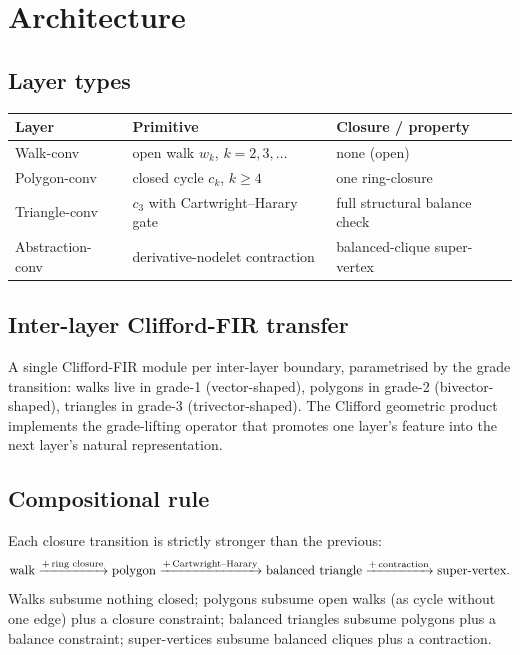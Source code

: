 \documentclass[11pt,a4paper]{article}
\begin{document}
\section{Architecture}

\subsection{Layer types}

\begin{center}
\begin{tabular}{lll}
\toprule
Layer            & Primitive                & Closure / property                          \\
\midrule
Walk-conv        & open walk $w_k$, $k = 2, 3, \ldots$ & none (open)                        \\
Polygon-conv     & closed cycle $c_k$, $k \geq 4$      & one ring-closure                   \\
Triangle-conv    & $c_3$ with Cartwright--Harary gate   & full structural balance check     \\
Abstraction-conv & derivative-nodelet contraction       & balanced-clique super-vertex      \\
\bottomrule
\end{tabular}
\end{center}

\subsection{Inter-layer Clifford-FIR transfer}

A single Clifford-FIR module per inter-layer boundary, parametrised
by the grade transition: walks live in grade-1 (vector-shaped),
polygons in grade-2 (bivector-shaped), triangles in grade-3
(trivector-shaped). The Clifford geometric product implements the
grade-lifting operator that promotes one layer's feature into the
next layer's natural representation.

\subsection{Compositional rule}

Each closure transition is strictly stronger than the previous:
\[
\text{walk} \xrightarrow{\text{+\,ring closure}}
\text{polygon} \xrightarrow{\text{+\,Cartwright--Harary}}
\text{balanced triangle} \xrightarrow{\text{+\,contraction}}
\text{super-vertex}.
\]
Walks subsume nothing closed; polygons subsume open walks
(as cycle without one edge) plus a closure constraint;
balanced triangles subsume polygons plus a balance constraint;
super-vertices subsume balanced cliques plus a contraction.
\end{document}
